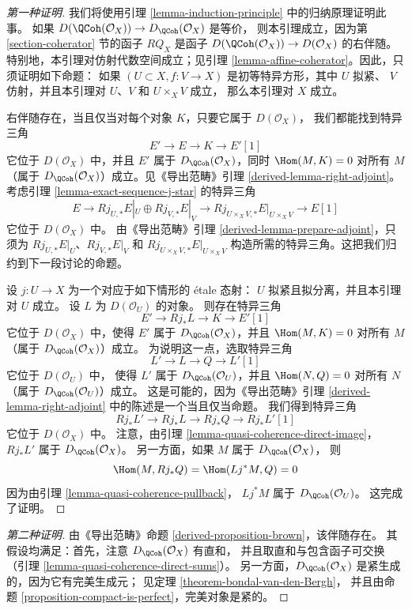 \begin{proof}[第一种证明]
我们将使用引理 \ref{lemma-induction-principle} 中的归纳原理证明此事。
如果 $D(\QCoh(\mathcal{O}_X)) \to D_\QCoh(\mathcal{O}_X)$ 是等价，
则本引理成立，因为第 \ref{section-coherator} 节的函子 $RQ_X$
是函子 $D(\QCoh(\mathcal{O}_X)) \to D(\mathcal{O}_X)$ 的右伴随。
特别地，本引理对仿射代数空间成立；见引理
\ref{lemma-affine-coherator}。因此，只须证明如下命题：
如果 $(U \subset X, f : V \to X)$ 是初等特异方形，其中 $U$ 拟紧、
$V$ 仿射，并且本引理对 $U$、$V$ 和 $U \times_X V$ 成立，
那么本引理对 $X$ 成立。

\medskip\noindent
右伴随存在，当且仅当对每个对象 $K$，只要它属于
$D(\mathcal{O}_X)$，
我们都能找到特异三角 %
$$
E' \to E \to K \to E'[1]
$$
它位于 $D(\mathcal{O}_X)$ 中，并且 $E'$ 属于
$D_\QCoh(\mathcal{O}_X)$，同时 $\Hom(M, K) = 0$
对所有 $M$（属于 $D_\QCoh(\mathcal{O}_X)$）成立。见《导出范畴》引理
\ref{derived-lemma-right-adjoint}。考虑引理
\ref{lemma-exact-sequence-j-star} 的特异三角
$$
E \to Rj_{U, *}E|_U \oplus Rj_{V, *}E|_V \to
Rj_{U \times_X V, *}E|_{U \times_X V} \to E[1]
$$
它位于 $D(\mathcal{O}_X)$ 中。
由《导出范畴》引理 \ref{derived-lemma-prepare-adjoint}，只须为
$Rj_{U, *}E|_U$、$Rj_{V, *}E|_V$ 和
$Rj_{U \times_X V, *}E|_{U \times_X V}$
构造所需的特异三角。这把我们归约到下一段讨论的命题。

\medskip\noindent
设 $j : U \to X$ 为一个对应于如下情形的 \'etale 态射：
$U$ 拟紧且拟分离，并且本引理对 $U$ 成立。%
设 $L$ 为 $D(\mathcal{O}_U)$ 的对象。
则存在特异三角
$$
E' \to Rj_*L \to K \to E'[1]
$$
它位于 $D(\mathcal{O}_X)$ 中，使得 $E'$ 属于
$D_\QCoh(\mathcal{O}_X)$，并且 $\Hom(M, K) = 0$ 对所有
$M$（属于 $D_\QCoh(\mathcal{O}_X)$）成立。
为说明这一点，选取特异三角
$$
L' \to L \to Q \to L'[1]
$$
它位于 $D(\mathcal{O}_U)$ 中，
使得 $L'$ 属于 $D_\QCoh(\mathcal{O}_U)$，并且
$\Hom(N, Q) = 0$ 对所有 $N$（属于
$D_\QCoh(\mathcal{O}_U)$）成立。
这是可能的，因为《导出范畴》引理
\ref{derived-lemma-right-adjoint} 中的陈述是一个当且仅当命题。
我们得到特异三角
$$
Rj_*L' \to Rj_*L \to Rj_*Q \to Rj_*L'[1]
$$
它位于 $D(\mathcal{O}_X)$ 中。
注意，由引理 \ref{lemma-quasi-coherence-direct-image}，
$Rj_*L'$ 属于 $D_\QCoh(\mathcal{O}_X)$。
另一方面，如果 $M$ 属于 $D_\QCoh(\mathcal{O}_X)$，%
则
$$
\Hom(M, Rj_*Q) = \Hom(Lj^*M, Q) = 0
$$
因为由引理 \ref{lemma-quasi-coherence-pullback}，
$Lj^*M$ 属于 $D_\QCoh(\mathcal{O}_U)$。
这完成了证明。
\end{proof}

\begin{proof}[第二种证明]
由《导出范畴》命题 \ref{derived-proposition-brown}，该伴随存在。
其假设均满足：首先，注意 $D_\QCoh(\mathcal{O}_X)$ 有直和，
并且取直和与包含函子可交换（引理
\ref{lemma-quasi-coherence-direct-sums}）。
另一方面，$D_\QCoh(\mathcal{O}_X)$ 是紧生成的，因为它有完美生成元；
见定理 \ref{theorem-bondal-van-den-Bergh}，%
并且由命题 \ref{proposition-compact-is-perfect}，完美对象是紧的。
\end{proof}

